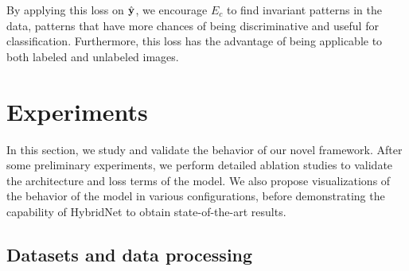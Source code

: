 By applying this loss on $\hat{\mathbf{y}}$, we encourage $E_c$ to find invariant patterns in the data, patterns that have more chances of being discriminative and useful for classification. Furthermore, this loss has the advantage of being applicable to both labeled and unlabeled images.

\section{Experiments}
\label{hybridnet:sec:experiements}

In this section, we study and validate the behavior of our novel framework. After some preliminary experiments, we perform detailed ablation studies to validate the architecture and loss terms of the model.  We also propose visualizations of the behavior of the model in various configurations, before demonstrating the capability of HybridNet to obtain state-of-the-art results.

\subsection{Datasets and data processing}

